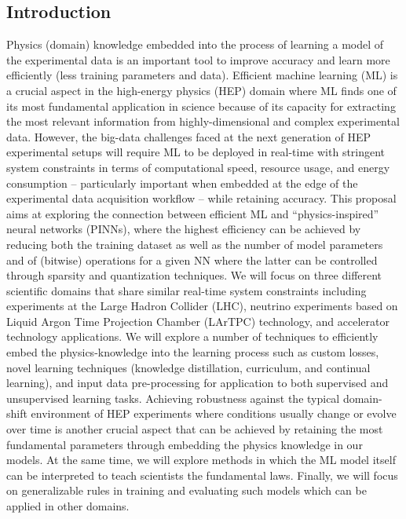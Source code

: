 \subsection*{Introduction}
\noindent Physics (domain) knowledge embedded into the process of learning a model of the experimental data is an important tool to improve accuracy and learn more efficiently (less training parameters and data).
Efficient machine learning (ML) is a crucial aspect in the high-energy physics (HEP) domain where ML finds one of its most fundamental application in science because of its capacity for extracting the 
most relevant information from highly-dimensional and complex experimental data. However, the big-data challenges faced at the next generation of HEP experimental setups will require ML to be deployed in real-time with stringent system constraints in terms of computational speed, resource usage, and energy consumption -- particularly important when embedded at the edge of the experimental data acquisition workflow -- while retaining accuracy.
This proposal aims at exploring the connection between efficient ML and ``physics-inspired'' neural networks (PINNs), where the highest efficiency can be achieved by reducing both the training dataset as well as the number of model parameters and of (bitwise) operations for a given NN where the latter can be controlled through sparsity and quantization techniques. We will focus on three different scientific domains that share similar real-time system constraints including experiments at the Large Hadron Collider (LHC), neutrino experiments based on Liquid Argon Time Projection Chamber (LArTPC) technology, and accelerator technology applications. We will explore a number of techniques to efficiently embed the physics-knowledge into the learning process such as custom losses, novel learning techniques (knowledge distillation, curriculum, and continual learning), and input data pre-processing for application to both supervised and unsupervised learning tasks. 
Achieving robustness against the typical domain-shift environment of HEP experiments where conditions usually change or evolve over time is another crucial aspect that can be achieved by retaining the most fundamental parameters through embedding the physics knowledge in our models.
At the same time, we will explore methods in which the ML model itself can be interpreted to teach scientists the fundamental laws. Finally, we will focus on generalizable rules in training and evaluating such models which can be applied in other domains.
